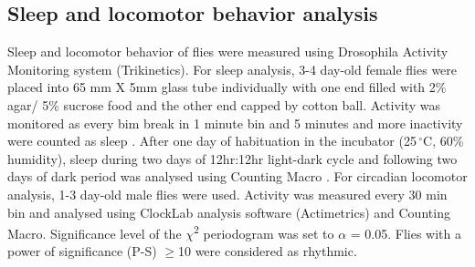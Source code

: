 \subsection*{Sleep and locomotor behavior analysis}

Sleep and locomotor behavior of flies were measured using Drosophila Activity Monitoring system (Trikinetics).
For sleep analysis, 3-4 day-old female flies were placed into 65 mm X 5mm glass tube individually with one end filled with 2\% agar/ 5\% sucrose food and the other end capped by cotton ball.
Activity was monitored as every bim break in 1 minute bin and 5 minutes and more inactivity were counted as sleep \cite{Shaw:2000ui}.
After one day of habituation in the incubator (25$\,^{\circ}\mathrm{C}$, 60\% humidity), sleep during two days of 12hr:12hr light-dark cycle and following two days of dark period was analysed using Counting Macro \cite{21041393}.
For circadian locomotor analysis, 1-3 day-old male flies were used. Activity was measured every 30 min bin and analysed using ClockLab analysis software (Actimetrics) and Counting Macro\cite{21041392}. Significance level of the $\chi$\textsuperscript{2} periodogram was set to $\alpha$ = 0.05.
Flies with a power of significance (P-S) $\geq$10 were considered as rhythmic.
  
  
  
  
  
  
  
  
  
  
  
  
  